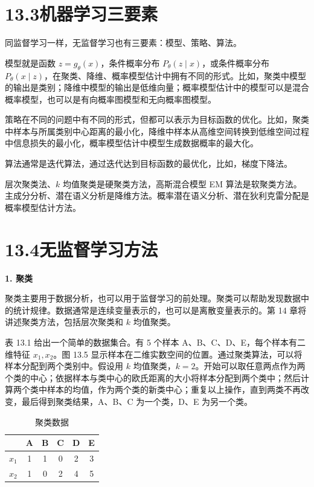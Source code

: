 \documentclass[UTF8, 12pt, fontset=fandol, oneside]{ctexart}
\begin{document}
\section*{13.3\quad 机器学习三要素}

同监督学习一样，无监督学习也有三要素：模型、策略、算法。

模型就是函数 $z=g_\theta(x)$，条件概率分布 $P_\theta(z\mid x)$，或条件概率分布 $P_\theta(x\mid z)$，在聚类、降维、概率模型估计中拥有不同的形式。比如，聚类中模型的输出是类别；降维中模型的输出是低维向量；概率模型估计中的模型可以是混合概率模型，也可以是有向概率图模型和无向概率图模型。

策略在不同的问题中有不同的形式，但都可以表示为目标函数的优化。比如，聚类中样本与所属类别中心距离的最小化，降维中样本从高维空间转换到低维空间过程中信息损失的最小化，概率模型估计中模型生成数据概率的最大化。

算法通常是迭代算法，通过迭代达到目标函数的最优化，比如，梯度下降法。

层次聚类法、$k$ 均值聚类是硬聚类方法，高斯混合模型 EM 算法是软聚类方法。主成分分析、潜在语义分析是降维方法。概率潜在语义分析、潜在狄利克雷分配是概率模型估计方法。

\section*{13.4\quad 无监督学习方法}

\noindent\textbf{1. 聚类}

聚类主要用于数据分析，也可以用于监督学习的前处理。聚类可以帮助发现数据中的统计规律。数据通常是连续变量表示的，也可以是离散变量表示的。第 14 章将讲述聚类方法，包括层次聚类和 $k$ 均值聚类。

表 13.1 给出一个简单的数据集合。有 5 个样本 A、B、C、D、E，每个样本有二维特征 $x_1,x_2$。图 13.5 显示样本在二维实数空间的位置。通过聚类算法，可以将样本分配到两个类别中。假设用 $k$ 均值聚类，$k=2$。开始可以取任意两点作为两个类的中心；依据样本与类中心的欧氏距离的大小将样本分配到两个类中；然后计算两个类中样本的均值，作为两个类的新类中心；重复以上操作，直到两类不再改变，最后得到聚类结果，A、B、C 为一个类，D、E 为另一个类。

\begin{table}[htbp]
\centering
\caption{聚类数据}
\begin{tabular}{c|ccccc}
\toprule
 & A & B & C & D & E\\
\midrule
$x_1$ & 1 & 1 & 0 & 2 & 3\\
$x_2$ & 1 & 0 & 2 & 4 & 5\\
\bottomrule
\end{tabular}
\end{table}
\end{document}
